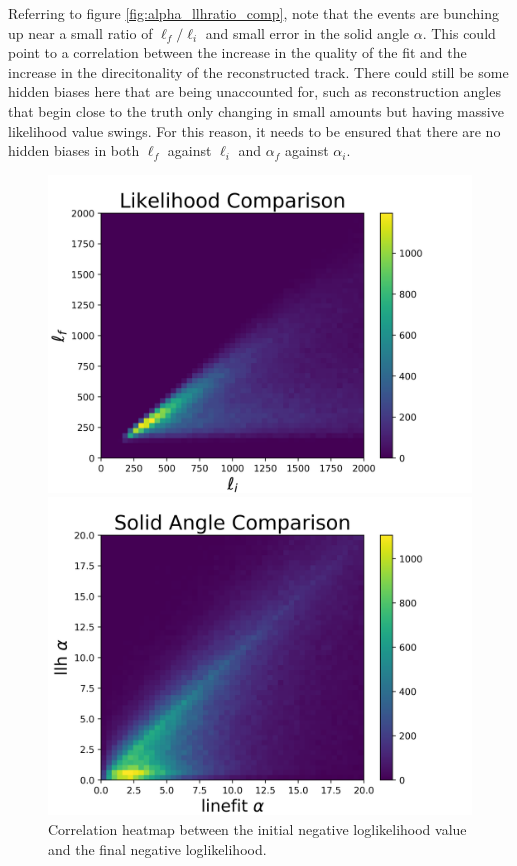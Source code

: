 Referring to figure \ref{fig:alpha_llhratio_comp}, note that the events are bunching up near a small ratio of $\ell_{f}/\ell_{i}$ and small error in the solid angle $\alpha$. This could point to a correlation between the increase in the quality of the fit and the increase in the direcitonality of the reconstructed track. There could still be some hidden biases here that are being unaccounted for, such as reconstruction angles that begin close to the truth only changing in small amounts but having massive likelihood value swings. For this reason, it needs to be ensured that there are no hidden biases in both $\ell_{f}$ against $\ell_{i}$ and $\alpha_{f}$ against $\alpha_{i}$.

\begin{figure}[ht]
  \begin{minipage}[b]{0.48\linewidth}
    \centering
    \includegraphics[width=\textwidth]{./Figures/reco_plots/llhratio_comp_heat.png}
    \caption{Correlation heatmap between the initial negative loglikelihood value and the final negative loglikelihood.}
    \label{subfig:llh_heat}
  \end{minipage}
  \hspace{0.1cm}
  \begin{minipage}[b]{0.48\linewidth}
    \centering
    \includegraphics[width=\textwidth]{./Figures/reco_plots/alpha_dist_comp_heat.png}

\end{minipage}
\end{figure}
